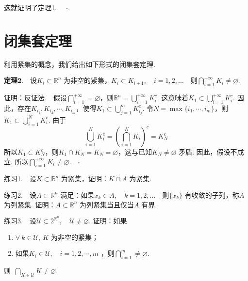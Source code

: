\documentclass{article}
\begin{document}
\vspace{20pt}

这就证明了定理1. \(\quad \square\)

\newpage

\section{闭集套定理}
利用紧集的概念，我们给出如下形式的闭集套定理.

\vspace{20pt}

\textbf{定理2}.\ \ 设\(K_i \subset \mathbb{R}^n\) 为非空的紧集，\(K_i \subset K_{i + 1},\quad i = 1,2,\dots \)\ \ 则\(\bigcap_{i = 1}^{ + \infty }K_i \neq \varnothing \).

\vspace{20pt}

证明：反证法.\ \ 假设\(\bigcap_{i = 1}^{ + \infty } = \varnothing \)，则\(\mathbb{R}^n = \bigcup_{i = 1}^{ + \infty }K_i^c\). 这意味着\(K_1 \subset \bigcup_{i = 1}^{ + \infty }K_i^c\). 因此，存在\(K_{i_1},K_{i_{2}},\cdots,K_{i_{m}}\)，使得\(K_1 \subset \bigcup_{j = 1}^{m}K_{i_j}^{c} \). 令\(N = \max \{i_1,\cdots ,i_m\} \)，则\(K_1 \subset \bigcup_{i = 1}^{N}K_i^{c} \). 由于
\begin{equation*}
    \bigcup_{i = 1}^{N}K_i^{c} = \left( \bigcap_{i = 1}^{N}K_i \right)^{c} = K_N^{c}
\end{equation*}
所以\(K_1 \subset K_N^{c} \)，则\(K_1 \cap K_N = K_N = \varnothing \)，这与已知\(K_N \neq \varnothing \) 矛盾. 因此，假设不成立. 所以\(\bigcap_{i = 1}^{ + \infty }K_i \neq \varnothing.\quad \square \)

\newpage

练习1.\ \ 设\(K \subset \mathbb{R}^n\) 为紧集，证明：\(K \cap A\) 为紧集.

\vspace{20pt}

练习2.\ \ 设\(A \subset \mathbb{R}^n\) 满足：如果\(x_k \in A,\quad k = 1,2,\dots \)\ \ 则\(\{x_k\}\) 有收敛的子列，称\(A\) 为列紧集. 证明：\(A \subset \mathbb{R}^n\) 为列紧集当且仅当\(A\) 有界.

\vspace{20pt}

练习3.\ \ 设\(\mathcal{U} \subset 2^{\mathbb{R}^n},\quad \mathcal{U} \neq \varnothing \). 证明：如果
\begin{enumerate}
    \item \(\forall\ k \in \mathcal{U},\ K\) 为非空的紧集；
    \item 如果\(K_i \in \mathcal{U},\quad i = 1,2,\cdots,m\) ，则\(\bigcap_{i = 1}^{m} \neq \varnothing \).
\end{enumerate}

则\ \(\bigcap_{K \in \mathcal{U}}K \neq \varnothing .\)
\end{document}
